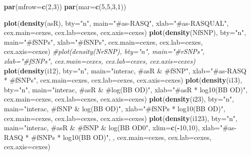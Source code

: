 \documentclass[]{article}
\newenvironment{Shaded}{\begin{snugshade}}{\end{snugshade}}
\newcommand{\KeywordTok}[1]{\textcolor[rgb]{0.13,0.29,0.53}{\textbf{#1}}}
\newcommand{\DataTypeTok}[1]{\textcolor[rgb]{0.13,0.29,0.53}{#1}}
\newcommand{\DecValTok}[1]{\textcolor[rgb]{0.00,0.00,0.81}{#1}}
\newcommand{\StringTok}[1]{\textcolor[rgb]{0.31,0.60,0.02}{#1}}
\newcommand{\CommentTok}[1]{\textcolor[rgb]{0.56,0.35,0.01}{\textit{#1}}}
\newcommand{\OperatorTok}[1]{\textcolor[rgb]{0.81,0.36,0.00}{\textbf{#1}}}
\newcommand{\NormalTok}[1]{#1}
\begin{document}
\begin{Shaded}
\begin{Highlighting}[]
\KeywordTok{par}\NormalTok{(}\DataTypeTok{mfrow=}\KeywordTok{c}\NormalTok{(}\DecValTok{2}\NormalTok{,}\DecValTok{3}\NormalTok{))}
\KeywordTok{par}\NormalTok{(}\DataTypeTok{mar=}\KeywordTok{c}\NormalTok{(}\DecValTok{5}\NormalTok{,}\DecValTok{5}\NormalTok{,}\DecValTok{3}\NormalTok{,}\DecValTok{1}\NormalTok{))}

\KeywordTok{plot}\NormalTok{(}\KeywordTok{density}\NormalTok{(asR), }\DataTypeTok{bty=}\StringTok{"n"}\NormalTok{, }\DataTypeTok{main=}\StringTok{"#as-RASQ"}\NormalTok{, }\DataTypeTok{xlab=}\StringTok{"#as-RASQUAL"}\NormalTok{, }\DataTypeTok{cex.main=}\NormalTok{cexes, }\DataTypeTok{cex.lab=}\NormalTok{cexes, }\DataTypeTok{cex.axis=}\NormalTok{cexes)}
\KeywordTok{plot}\NormalTok{(}\KeywordTok{density}\NormalTok{(NfSNP), }\DataTypeTok{bty=}\StringTok{"n"}\NormalTok{, }\DataTypeTok{main=}\StringTok{"#fSNPs"}\NormalTok{, }\DataTypeTok{xlab=}\StringTok{"#fSNPs"}\NormalTok{, }\DataTypeTok{cex.main=}\NormalTok{cexes, }\DataTypeTok{cex.lab=}\NormalTok{cexes, }\DataTypeTok{cex.axis=}\NormalTok{cexes)}
\CommentTok{#plot(density(NrSNP), bty="n", main="#rSNPs", xlab="#fSNPs", cex.main=cexes, cex.lab=cexes, cex.axis=cexes)}
\KeywordTok{plot}\NormalTok{(}\KeywordTok{density}\NormalTok{(i12), }\DataTypeTok{bty=}\StringTok{"n"}\NormalTok{, }\DataTypeTok{main=}\StringTok{"interac, #asR & #fSNP"}\NormalTok{, }
     \DataTypeTok{xlab=}\StringTok{"#as-RASQ * #fSNPs"}\NormalTok{, }\DataTypeTok{cex.main=}\NormalTok{cexes, }\DataTypeTok{cex.lab=}\NormalTok{cexes, }\DataTypeTok{cex.axis=}\NormalTok{cexes)}
\KeywordTok{plot}\NormalTok{(}\KeywordTok{density}\NormalTok{(i13), }\DataTypeTok{bty=}\StringTok{"n"}\NormalTok{, }\DataTypeTok{main=}\StringTok{"interac, #asR & #log(BB OD)"}\NormalTok{, }
     \DataTypeTok{xlab=}\StringTok{"#asR * log10(BB OD)"}\NormalTok{, }\DataTypeTok{cex.main=}\NormalTok{cexes, }\DataTypeTok{cex.lab=}\NormalTok{cexes, }\DataTypeTok{cex.axis=}\NormalTok{cexes)}
\KeywordTok{plot}\NormalTok{(}\KeywordTok{density}\NormalTok{(i23), }\DataTypeTok{bty=}\StringTok{"n"}\NormalTok{, }\DataTypeTok{main=}\StringTok{"interac, #fSNP & log(BB OD)"}\NormalTok{, }
     \DataTypeTok{xlab=}\StringTok{"#fSNPs * log10(BB OD)"}\NormalTok{, }\DataTypeTok{cex.main=}\NormalTok{cexes, }\DataTypeTok{cex.lab=}\NormalTok{cexes, }\DataTypeTok{cex.axis=}\NormalTok{cexes)}
\KeywordTok{plot}\NormalTok{(}\KeywordTok{density}\NormalTok{(i123), }\DataTypeTok{bty=}\StringTok{"n"}\NormalTok{, }\DataTypeTok{main=}\StringTok{"interac, #asR & #fSNP & log(BB OD0"}\NormalTok{, }\DataTypeTok{xlim=}\KeywordTok{c}\NormalTok{(}\OperatorTok{-}\DecValTok{10}\NormalTok{,}\DecValTok{10}\NormalTok{),}
     \DataTypeTok{xlab=}\StringTok{"#as-RASQ * #fSNPs * log10(BB OD)"}\NormalTok{, , }\DataTypeTok{cex.main=}\NormalTok{cexes, }\DataTypeTok{cex.lab=}\NormalTok{cexes, }\DataTypeTok{cex.axis=}\NormalTok{cexes)}
\end{Highlighting}
\end{Shaded}
\end{document}
